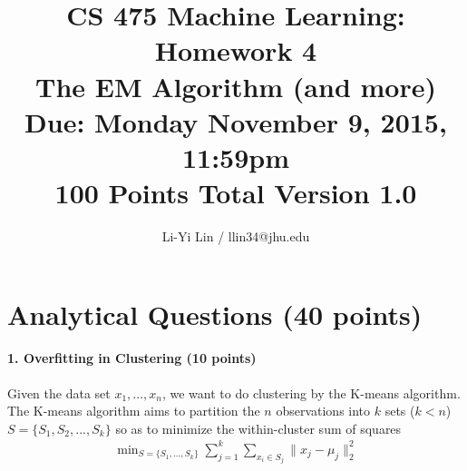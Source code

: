 \documentclass[11pt]{article}
\title{CS 475 Machine Learning: Homework 4\\The EM Algorithm (and more)\\
\Large{Due: Monday November 9, 2015, 11:59pm}\\
100 Points Total \hspace{1cm} Version 1.0}
\author{Li-Yi Lin / llin34@jhu.edu\\}
\date{}
\begin{document}
\large
\maketitle
\thispagestyle{headings}

\section{Analytical Questions (40 points)}

\paragraph{1. Overfitting in Clustering (10 points)}

Given the data set $x_1,...,x_n$, we want to do clustering by the K-means algorithm. The K-means algorithm aims to partition the $n$ observations into $k$ sets ($k < n$) $S = \{S_1, S_2, ... , S_k\}$ so as to minimize the within-cluster sum of squares
\begin{eqnarray*}
\mathop{\textrm{min}}_{S=\{S_1,...,S_k\}}\sum_{j=1}^k\sum_{x_i\in S_j}\|x_j-\mu_j\|_2^2
\end{eqnarray*}
\end{document}
